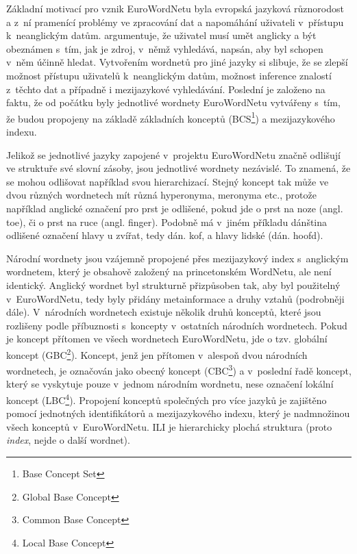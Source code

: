 \documentclass[a4paper, 11pt, oneside, showtrims]{book}
\newcommand\ex{\textsf}
\begin{document}
				Základní motivací pro vznik EuroWordNetu byla evropská jazyková různorodost a z~ní pramenící problémy ve zpracování dat a napomáhání uživateli v~přístupu k~neanglickým datům. \textcite{vossen1997eurowordnet} argumentuje, že uživatel musí umět anglicky a být obeznámen s~tím, jak je zdroj, v~němž vyhledává, napsán, aby byl schopen v~něm účinně hledat. Vytvořením wordnetů pro jiné jazyky si slibuje, že se zlepší možnost přístupu uživatelů k~neanglickým datům, možnost inference znalostí z~těchto dat a případně i mezijazykové vyhledávání. Poslední je založeno na faktu, že od počátku byly jednotlivé wordnety EuroWordNetu vytvářeny s~tím, že budou propojeny na základě základních konceptů (BCS\footnote{Base Concept Set}) a mezijazykového indexu.

				Jelikož se jednotlivé jazyky zapojené v~projektu EuroWordNetu značně odlišují ve struktuře své slovní zásoby, jsou jednotlivé wordnety nezávislé. To znamená, že se mohou odlišovat například svou hierarchizací. Stejný koncept tak může ve dvou různých wordnetech mít různá hyperonyma, meronyma etc., protože například anglické označení pro \ex{prst} je odlišené, pokud jde o \ex{prst na noze} (angl. \ex{toe}), či o \ex{prst na ruce} (angl. \ex{finger}). Podobně má v~jiném příkladu dánština odlišené označení \ex{hlavy u zvířat}, tedy dán. \ex{kof}, a \ex{hlavy lidské} (dán. \ex{hoofd}). \parencite{vossen1997eurowordnet}

				Národní wordnety jsou vzájemně propojené přes mezijazykový index s~anglickým wordnetem, který je obsahově založený na princetonském WordNetu, ale není identický. Anglický wordnet byl strukturně přizpůsoben tak, aby byl použitelný v~EuroWordNetu, tedy byly přidány metainformace a druhy vztahů (podrobněji dále). V~národních wordnetech existuje několik druhů konceptů, které jsou rozlišeny podle příbuznosti s~koncepty v~ostatních národních wordnetech. Pokud je koncept přítomen ve všech wordnetech EuroWordNetu, jde o tzv. globální koncept (GBC\footnote{Global Base Concept}). Koncept, jenž jen přítomen v~alespoň dvou národních wordnetech, je označován jako obecný koncept (CBC\footnote{Common Base Concept}) a v~poslední řadě koncept, který se vyskytuje pouze v~jednom národním wordnetu, nese označení lokální koncept (LBC\footnote{Local Base Concept}). \parencite{gwa2013baseconcepts} Propojení konceptů společných pro více jazyků je zajištěno pomocí jednotných identifikátorů a mezijazykového indexu, který je nadmnožinou všech konceptů v~EuroWordNetu. ILI je hierarchicky plochá struktura (proto \textit{index}, nejde o další  wordnet). \parencite{vossen1997eurowordnet}
\end{document}
